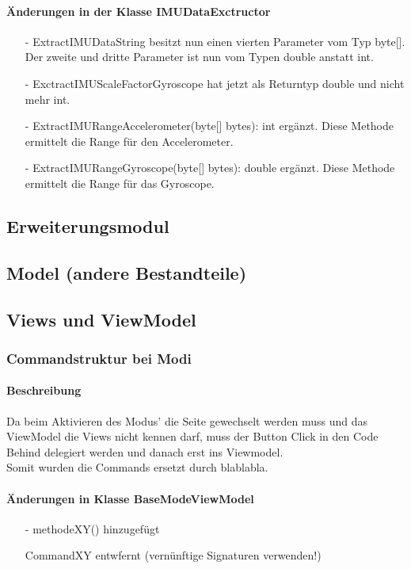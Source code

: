 \documentclass[a4paper,12pt]{article}
\begin{document}
\paragraph{Änderungen in der Klasse IMUDataExctructor}
\begin{itemize}
	 \item[-]  ExtractIMUDataString besitzt nun einen vierten Parameter vom Typ byte[]. Der zweite und dritte Parameter ist nun vom Typen double anstatt int.
	\item[-] ExctractIMUScaleFactorGyroscope hat jetzt als Returntyp double und nicht mehr int.
	\item[-] ExtractIMURangeAccelerometer(byte[] bytes): int ergänzt. Diese Methode ermittelt die Range für den Accelerometer.
	\item[-] ExtractIMURangeGyroscope(byte[] bytes): double ergänzt. Diese Methode ermittelt die Range für das Gyroscope.
\end{itemize}

\subsection{Erweiterungsmodul}

\subsection{Model (andere Bestandteile)}

\subsection{Views und ViewModel}
\subsubsection{Commandstruktur bei Modi}
\paragraph{Beschreibung}
Da beim Aktivieren des Modus' die Seite gewechselt werden muss und das ViewModel die Views nicht kennen darf, muss der Button Click in den Code Behind delegiert werden und danach erst ins Viewmodel.\\
Somit wurden die Commands ersetzt durch blablabla.
\paragraph{Änderungen in Klasse BaseModeViewModel}
\begin{itemize}
  \item[-] methodeXY() hinzugefügt
  \item[] CommandXY entwfernt (vernünftige Signaturen verwenden!)
\end{itemize}
\end{document}
